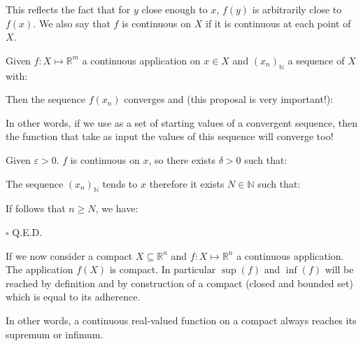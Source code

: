	This reflects the fact that for $y$ close enough to $x$, $f (y)$ is arbitrarily close to $f (x)$. We also say that $f$ is continuous on $X$ if it is continuous at each point of $X$.
	\begin{theorem}
	Given $f:X\mapsto \mathbb{R}^m$ a continuous application on $x\in X$ and $(x_n)_\mathbb{N}$ a sequence of $X$ with:
	
	Then the sequence $f(x_n)$ converges and (this proposal is very important!):
	
	In other words, if we use as a set of starting values of a convergent sequence, then the function that take as input the values of this sequence  will converge too!
	\end{theorem}
	\begin{dem}
	Given $\varepsilon >0$. $f$ is continuous on $x$, so there exists $\delta>0$ such that:
	
	The sequence $(x_n)_\mathbb{N}$ tends to $x$ therefore it exists $N\in \mathbb{N}$ such that:
	
	If follows that $n\geq N$, we have:
	
	\begin{flushright}
		$\square$  Q.E.D.
	\end{flushright}
	\end{dem}
	If we now consider a compact $X\subseteq \mathbb{R}^n$ and $f:X\mapsto \mathbb{R}^n$ a continuous application. The application $f(X)$ is compact. In particular $\sup (f)$ and $\inf (f)$ will be reached by definition and  by construction of a compact (closed and bounded set) which is equal to its adherence.
	\begin{theorem}
		In other words, a continuous real-valued function on a compact always reaches its supremum or infimum.
	\end{theorem}
